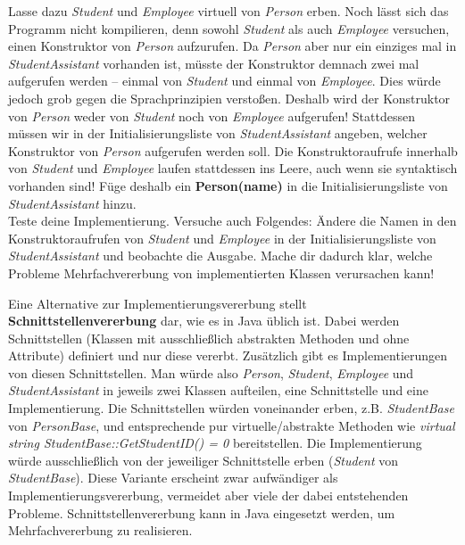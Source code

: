 \begin{enumerate}
Lasse dazu \emph{Student} und \emph{Employee} virtuell von \emph{Person} erben.
Noch lässt sich das Programm nicht kompilieren, denn sowohl \emph{Student} als auch \emph{Employee} versuchen, einen Konstruktor von \emph{Person} aufzurufen.
Da \emph{Person} aber nur ein einziges mal in \emph{StudentAssistant} vorhanden ist, müsste der Konstruktor demnach zwei mal aufgerufen werden -- einmal von \emph{Student} und einmal von \emph{Employee}.
Dies würde jedoch grob gegen die Sprachprinzipien verstoßen.
Deshalb wird der Konstruktor von \emph{Person} weder von \emph{Student} noch von \emph{Employee} aufgerufen!
Stattdessen müssen wir in der Initialisierungsliste von \emph{StudentAssistant} angeben, welcher Konstruktor von \emph{Person} aufgerufen werden soll.
Die Konstruktoraufrufe innerhalb von \emph{Student} und \emph{Employee} laufen stattdessen ins Leere, auch wenn sie syntaktisch vorhanden sind! Füge deshalb ein \textbf{Person(name)} in die Initialisierungsliste von \emph{StudentAssistant} hinzu.\\

Teste deine Implementierung.
Versuche auch Folgendes: Ändere die Namen in den Konstruktoraufrufen von \emph{Student} und \emph{Employee} in der Initialisierungsliste von \emph{StudentAssistant} und beobachte die Ausgabe. 
Mache dir dadurch klar, welche Probleme Mehrfachvererbung von implementierten Klassen verursachen kann!\\

\end{enumerate}

Eine Alternative zur Implementierungsvererbung stellt \textbf{Schnittstellenvererbung} dar, wie es in Java üblich ist. Dabei werden Schnittstellen (Klassen mit ausschließlich abstrakten Methoden und ohne Attribute) definiert und nur diese vererbt.
Zusätzlich gibt es Implementierungen von diesen Schnittstellen.
Man würde also \emph{Person}, \emph{Student}, \emph{Employee} und \emph{StudentAssistant} in jeweils zwei Klassen aufteilen, eine Schnittstelle und eine Implementierung.
Die Schnittstellen würden voneinander erben, z.B. \emph{StudentBase} von \emph{PersonBase}, und entsprechende pur virtuelle/abstrakte Methoden wie \emph{virtual string StudentBase::GetStudentID() = 0} bereitstellen.
Die Implementierung würde ausschließlich von der jeweiliger Schnittstelle erben (\emph{Student} von \emph{StudentBase}).
Diese Variante erscheint zwar aufwändiger als Implementierungsvererbung, vermeidet aber viele der dabei entstehenden Probleme. 
Schnittstellenvererbung kann in Java eingesetzt werden, um Mehrfachvererbung zu realisieren.



